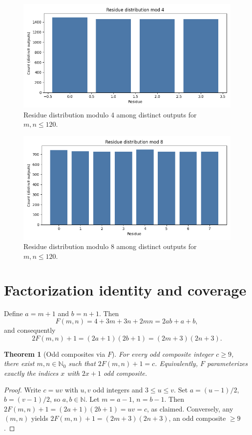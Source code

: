 \documentclass[12pt,a4paper]{article}
\newtheorem{theorem}{Theorem}[section]
\begin{document}
\begin{figure}[h]
\centering
\includegraphics[width=0.7\linewidth]{../fig/residues_mod_4.png}
\caption{Residue distribution modulo 4 among distinct outputs for \(m,n\le 120\).}
\label{fig:mod4}
\end{figure}

\begin{figure}[h]
\centering
\includegraphics[width=0.7\linewidth]{../fig/residues_mod_8.png}
\caption{Residue distribution modulo 8 among distinct outputs for \(m,n\le 120\).}
\label{fig:mod8}
\end{figure}

\section{Factorization identity and coverage}
Define \(a=m+1\) and \(b=n+1\). Then
\[
F(m,n) = 4 + 3m + 3n + 2mn = 2ab + a + b,
\]
and consequently
\[
2F(m,n) + 1 = (2a+1)(2b+1) = (2m+3)(2n+3).
\]

\begin{theorem}[Odd composites via \(F\)]\label{thm:coverage}
For every odd composite integer \(c\ge 9\), there exist \(m,n\in\mathbb{N}_0\) such that \(2F(m,n) + 1 = c\). Equivalently, \(F\) parameterizes exactly the indices \(x\) with \(2x+1\) odd composite.
\end{theorem}
\begin{proof}
Write \(c=uv\) with \(u,v\) odd integers and \(3\le u\le v\). Set \(a=(u-1)/2\), \(b=(v-1)/2\), so \(a,b\in\mathbb{N}\). Let \(m=a-1\), \(n=b-1\). Then
\(2F(m,n) + 1 = (2a+1)(2b+1) = uv = c\), as claimed. Conversely, any \((m,n)\) yields \(2F(m,n)+1=(2m+3)(2n+3)\), an odd composite \(\ge 9\).
\end{proof}
\end{document}
